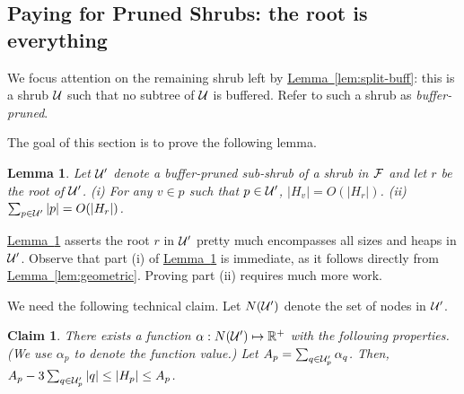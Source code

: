 \documentclass[11pt]{article}
\newtheorem{claim}[theorem]{Claim}
\newtheorem{lemma}[theorem]{Lemma}
\newtheorem{definition}[theorem]{Definition}
\theoremstyle{definition}
\newcommand{\cF}{{\cal F}}
\newcommand{\cU}{{\cal U}}
\newcommand{\RR}{\mathbb{R}}
\newcommand{\Lem}[1]{\hyperref[lem:#1]{Lemma~\ref*{lem:#1}}} %
\newcommand{\Def}[1]{\hyperref[def:#1]{Definition~\ref*{def:#1}}} %
\newcommand{\pmax}{P_{\max}}
\newcommand{\redH}{\widetilde{H}}
\begin{document}
\newcommand{\pruned}{\cU'}
\subsection{Paying for Pruned Shrubs: the root is everything} \label{sec:weight}

We focus attention on the remaining shrub left by \Lem{split-buff}: this is 
a shrub $\cU$ such that no subtree of $\cU$ is buffered. Refer to such
a shrub as \emph{buffer-pruned}.

% 
% 
The goal of this section is to prove the following lemma.

\begin{lemma} \label{lem:cu-root} Let $\pruned$ denote a buffer-pruned sub-shrub of a shrub in $\cF$ and let $r$
be the root of $\pruned$. (i) For any $v \in p$ such that $p \in \pruned$,
$|H_v| = O(|H_r|)$. (ii) $\sum_{p \in \pruned} |p| = O(|H_r|)$.
\end{lemma}

\Lem{cu-root} asserts the root $r$ in $\pruned$ pretty much encompasses all sizes and heaps in $\pruned$.
Observe that part (i) of \Lem{cu-root} is immediate, as it follows directly from \Lem{geometric}. Proving part (ii) requires much more work.

We need the following technical claim. Let $N(\pruned)$ denote the set of nodes in $\pruned$.

\begin{claim} \label{clm:weights} There exists a function $\alpha:N(\pruned) \mapsto \RR^+$
with the following properties. (We use $\alpha_p$ to denote the function value.)
Let $A_p = \sum_{q \in \pruned_p} \alpha_q$.
Then, $A_p - 3\sum_{q \in \pruned_p} |q| \leq |H_p| \leq A_p$.
\end{claim}
\end{document}
